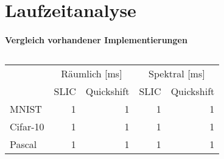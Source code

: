 \section{Laufzeitanalyse}
\label{laufzeitanalyse}








\paragraph{Vergleich \bzgl{} vorhandener Implementierungen}
\label{vergleich_laufzeit}



\begin{table}[t]
\centering
\begin{tabular}{lrrrr}
  \toprule
  & \multicolumn{2}{c}{Räumlich [ms]} & \multicolumn{2}{c}{Spektral [ms]}\\
  \cmidrule{2-5}
  & \gls{SLIC} & Quickshift & \gls{SLIC} & Quickshift\\
  \midrule
  \gls{MNIST} & 1 & 1 & 1 & 1\\
  \gls{Cifar}-10 & 1 & 1 & 1 & 1\\
  \gls{Pascal} & 1 & 1 & 1 & 1\\
  \bottomrule
\end{tabular}
\caption[Laufzeiten der räumlichen und spektralen Vorverarbeitungsschritte]{}
\label{tab:laufzeit_raeumlich_spektral}
\end{table}


